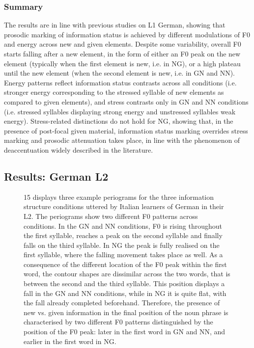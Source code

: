 \subsubsection{Summary}
\hypertarget{Toc191305907}{}
The results are in line with previous studies on L1 German, showing that prosodic marking of information status is achieved by different modulations of F0 and energy across new and given elements. Despite some variability, overall F0 starts falling after a new element, in the form of either an F0 peak on the new element (typically when the first element is new, i.e. in NG), or a high plateau until the new element (when the second element is new, i.e. in GN and NN). Energy patterns reflect information status contrasts across all conditions (i.e. stronger energy corresponding to the stressed syllable of new elements as compared to given elements), and stress contrasts only in GN and NN conditions (i.e. stressed syllables displaying strong energy and unstressed syllables weak energy). Stress-related distinctions do not hold for NG, showing that, in the presence of post-focal given material, information status marking overrides stress marking and prosodic attenuation takes place, in line with the phenomenon of deaccentuation widely described in the literature.

\subsection{Results: German L2}
\hypertarget{Toc191305908}{}\begin{figure}
\caption{15 displays three example periograms for the three information structure conditions uttered by Italian learners of German in their L2. The periograms show two different F0 patterns across conditions. In the GN and NN conditions, F0 is rising throughout the first syllable, reaches a peak on the second syllable and finally falls on the third syllable. In NG the peak is fully realised on the first syllable, where the falling movement takes place as well. As a consequence of the different location of the F0 peak within the first word, the contour shapes are dissimilar across the two words, that is between the second and the third syllable. This position displays a fall in the GN and NN conditions, while in NG it is quite flat, with the fall already completed beforehand. Therefore, the presence of new vs. given information in the final position of the noun phrase is characterised by two different F0 patterns distinguished by the position of the F0 peak: later in the first word in GN and NN, and earlier in the first word in NG.}
\label{fig:key:2}
\end{figure}


